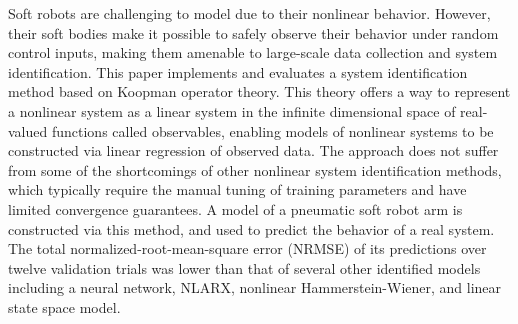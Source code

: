 Soft robots are challenging to model due to their nonlinear behavior.
However, their soft bodies make it possible to safely observe their behavior under random control inputs, making them amenable to large-scale data collection and system identification.
This paper implements and evaluates a system identification method based on Koopman operator theory.
This theory offers a way to represent a nonlinear system as a linear system in the infinite dimensional space of real-valued functions called observables, enabling models of nonlinear systems to be constructed via linear regression of observed data.
The approach does not suffer from some of the shortcomings of other nonlinear system identification methods, which typically require the manual tuning of training parameters and have limited convergence guarantees.
A model of a pneumatic soft robot arm is constructed via this method, and used to predict the behavior of a real system.
The total normalized-root-mean-square error (NRMSE) of its predictions over twelve validation trials was lower than
that of several other identified models including a neural network, NLARX, nonlinear Hammerstein-Wiener, and linear state space model.











